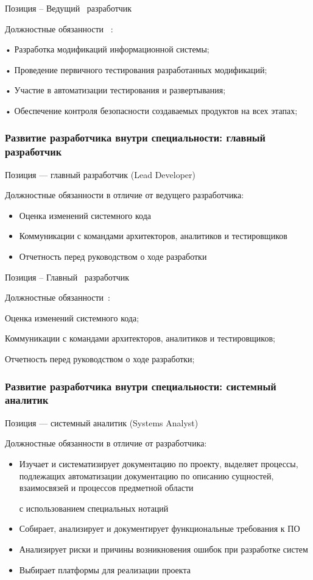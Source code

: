 \documentclass{../industrial-development}
\begin{document}
\lecturenotes

Позиция – Ведущий~\cite{hh} разработчик~\cite{itcf}

Должностные обязанности~\cite{rab} :

• Разработка модификаций  информационной системы;

• Проведение первичного тестирования разработанных модификаций;

• Участие в автоматизации тестирования и развертывания;

• Обеспечение контроля безопасности создаваемых продуктов на всех этапах;

\begin{frame} \frametitle{Развитие разработчика внутри специальности: главный разработчик}
 \begin{block}{}
  \alert{Позиция --- главный разработчик (Lead Developer)}

Должностные обязанности в отличие от ведущего разработчика: 
  \end{block}
  \begin{itemize}
  \item Оценка изменений системного кода
  \item Коммуникации с командами архитекторов, аналитиков и тестировщиков
 \item  Отчетность перед руководством о ходе разработки
  \end{itemize}
\end{frame}

\lecturenotes

Позиция – Главный~\cite{hh} разработчик~\cite{itcf}

Должностные обязанности~\cite{rab}:

Оценка изменений системного кода;

Коммуникации с командами архитекторов, аналитиков и тестировщиков;

Отчетность перед руководством о ходе разработки; 

\begin{frame} \frametitle{Развитие разработчика внутри специальности: системный аналитик}
 \begin{block}{}
  \alert{Позиция --- системный аналитик (Systems Analyst)}

Должностные обязанности в отличие от разработчика: 
  \end{block}
  \begin{itemize}
\item  Изучает и систематизирует документацию по проекту, выделяет процессы, подлежащих автоматизации
   документацию по описанию сущностей, взаимосвязей и процессов предметной области 

с использованием специальных нотаций
  \item Собирает, анализирует и документирует функциональные требования к ПО
 \item  Анализирует риски и причины возникновения ошибок при разработке систем
 \item Выбирает платформы для реализации проекта
  \end{itemize}
\end{frame}
\end{document}
